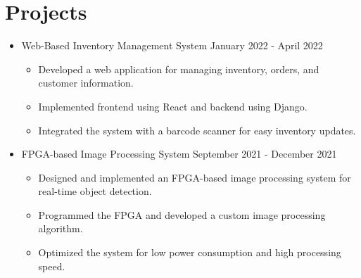 \documentclass[a4paper,12pt]{article} %
\begin{document}
\section*{Projects}
\begin{itemize}[leftmargin=*]
    \item Web-Based Inventory Management System \hfill January 2022 - April 2022
          \begin{itemize}
              \item Developed a web application for managing inventory, orders, and customer information.
              \item Implemented frontend using React and backend using Django.
              \item Integrated the system with a barcode scanner for easy inventory updates.
          \end{itemize}
    \item FPGA-based Image Processing System \hfill September 2021 - December 2021
          \begin{itemize}
              \item Designed and implemented an FPGA-based image processing system for real-time object detection.
              \item Programmed the FPGA and developed a custom image processing algorithm.
              \item Optimized the system for low power consumption and high processing speed.
          \end{itemize}
\end{itemize}
\end{document}
